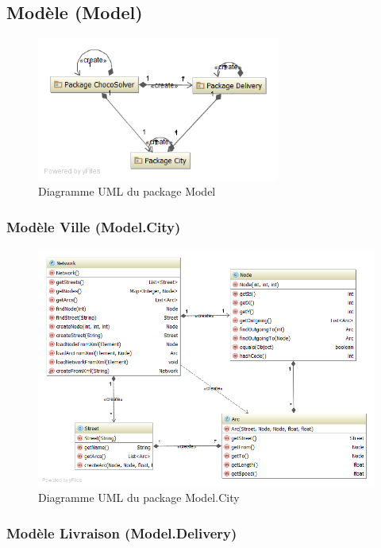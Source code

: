 \subsection{Mod\`ele (Model)}

\begin{figure}[h]
    \centering
    \includegraphics[width=80mm]{../diagrams/classes_packages/classes_packages/model/package_model.png}
    \caption{Diagramme UML du package Model}
    \label{diagram:uml_model}
\end{figure}
\pagebreak

\subsubsection{Mod\`ele Ville (Model.City)}

\begin{figure}[h]
    \centering
    \includegraphics[width=160mm]{../diagrams/classes_packages/classes_packages/model/city.png}
    \caption{Diagramme UML du package Model.City}
    \label{diagram:uml_model_city}
\end{figure}
\pagebreak

\subsubsection{Mod\`ele Livraison (Model.Delivery)}

